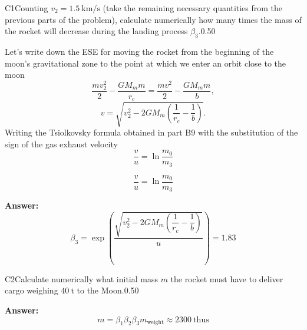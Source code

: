 \documentclass[11pt,a4paper]{article}
\begin{document}
\begin{solcard}{C1}{Counting $v_2 = 1.5~\mathrm{km}/\mathrm{s}$ (take the remaining necessary quantities from the previous parts of the problem), calculate numerically how many times the mass of the rocket will decrease during the landing process $\beta_3$.}{0.50}

Let's write down the ESE for moving the rocket from the beginning of the moon's gravitational zone to the point at which we enter an orbit close to the moon $$\dfrac{mv_2^2}{2}-\dfrac{GM_mm}{r_c}=\dfrac{mv^2}{2}-\dfrac{GM_mm}{b},$$ $$v=\sqrt{v_2^2-2GM_m\left(\dfrac{1}{r_c}-\dfrac{1}{b}\right)}.$$ Writing the Tsiolkovsky formula obtained in part B9 with the substitution of the sign of the gas exhaust velocity $$\dfrac{v}{u}=\ln{\dfrac{m_0}{m_3}}$$


$$\dfrac{v}{u}=\ln{\dfrac{m_0}{m_3}}$$

\par\smallskip\noindent\textbf{Answer:} $$\beta_3=\exp{\left(\dfrac{\sqrt{v_2^2-2GM_m\left(\dfrac{1}{r_c}-\dfrac{1}{b}\right)}}{u}\right)}=1.83$$
\end{solcard}

\begin{solcard}{C2}{Calculate numerically what initial mass $m$ the rocket must have to deliver cargo weighing $40~\text{t}$ to the Moon.}{0.50}
\par\smallskip\noindent\textbf{Answer:} $$m=\beta_1\beta_2\beta_3 m_{\text{weight}}\approx2300~\text{thus}$$
\end{solcard}
\end{document}
